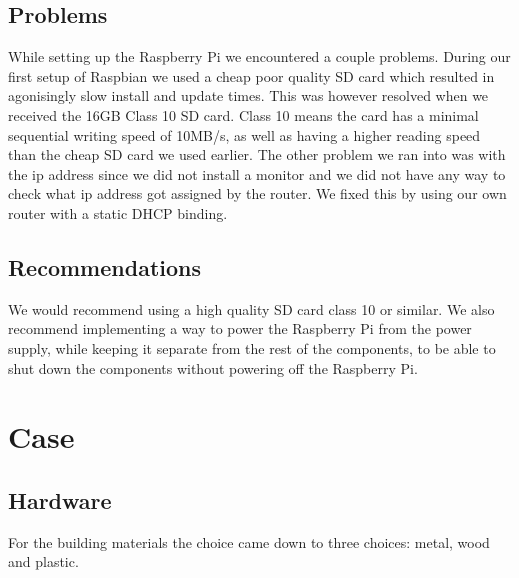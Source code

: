 \documentclass[a4paper,oneside]{book}
\begin{document}
\subsection{Problems}
While setting up the Raspberry Pi we encountered a couple problems. During our
first setup of Raspbian we used a cheap poor quality SD card which resulted in
agonisingly slow install and update times. This was however resolved when we
received the 16GB Class 10 SD card. Class 10 means the card has a minimal
sequential writing speed of 10MB/s, as well as having a higher reading speed
than the cheap SD card we used earlier. The other problem we ran into was with
the ip address since we did not install a monitor and we did not have any way
to check what ip address got assigned by the router. We fixed this by using our
own router with a static DHCP binding.

\subsection{Recommendations}
We would recommend using a high quality SD card class 10 or similar. We also
recommend implementing a way to power the Raspberry Pi from the power supply,
while keeping it separate from the rest of the components, to be able to shut
down the components without powering off the Raspberry Pi.

\section{Case}
\label{sec:case}
\subsection{Hardware}
For the building materials the choice came down to three choices: metal, wood
and plastic.
\end{document}
